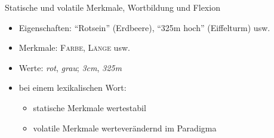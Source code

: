 \begin{frame}
  {Statische und volatile Merkmale, Wortbildung und Flexion}
  \pause
  \begin{itemize}[<+->]
    \item Eigenschaften: "`Rotsein"' (Erdbeere), "`325m hoch"' (Eiffelturm) usw.
    \item Merkmale: \alert{\textsc{Farbe}}, \alert{\textsc{Länge}} usw.
    \item Werte: \alert{\textit{rot}}, \alert{\textit{grau}}; \alert{\textit{3cm}}, \alert{\textit{325m}}
  \end{itemize}
  \pause
  \Zeile
  \begin{exe}
    \ex
    \begin{xlist}
      \pause
      \pause
    \end{xlist}
  \end{exe}
  \Zeile
  \pause
  \begin{itemize}[<+->]
    \item bei einem lexikalischen Wort:
      \begin{itemize}
        \item \alert{statische Merkmale} wertestabil
        \item \alert{volatile Merkmale} werteverändernd im Paradigma
      \end{itemize}
  \end{itemize}
\end{frame}

